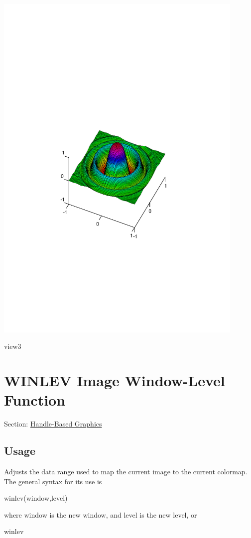  
\begin{DoxyImage}
\includegraphics[width=12cm]{view3}
\caption{view3}
\end{DoxyImage}
 \hypertarget{handle_winlev}{}\section{W\-I\-N\-L\-E\-V Image Window-\/\-Level Function}\label{handle_winlev}
Section\-: \hyperlink{sec_handle}{Handle-\/\-Based Graphics} \hypertarget{vtkwidgets_vtkxyplotwidget_Usage}{}\subsection{Usage}\label{vtkwidgets_vtkxyplotwidget_Usage}
Adjusts the data range used to map the current image to the current colormap. The general syntax for its use is \begin{DoxyVerb}  winlev(window,level)
\end{DoxyVerb}
 where {\ttfamily window} is the new window, and {\ttfamily level} is the new level, or \begin{DoxyVerb}  winlev
\end{DoxyVerb}
